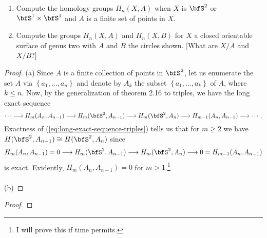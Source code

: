 \begin{problem}[Hatcher {\S}2.1, Ex.\,17]
\begin{enumerate}[label=(\alph*)]
\item Compute the homology groups $H_n(X,A)$ when $X$ is $\bfS^2$ or
  $\bfS^1\times\bfS^1$ and $A$ is a finite set of points in $X$.
\item Compute the groups $H_n(X,A)$ and $H_n(X,B)$ for $X$ a closed
  orientable surface of genus two with $A$ and $B$ the circles shown. [What
  are $X/A$ and $X/B$?]
\end{enumerate}
\end{problem}
\begin{proof}
(a) Since $A$ is a finite collection of points in $\bfS^2$, let us enumerate
the set $A$ via $\left\{ a_1,...,a_n \right\}$ and denote by $A_k$ the
subset $\left\{a_1,...,a_k\right\}$ of $A$, where $k\leq n$. Now, by the
generalization of theorem 2.16 to triples, we have the long exact sequence
\begin{equation}
\label{eq:long-exact-sequence-triples}
\cdots\longrightarrow H_m(A_n,A_{n-1})\longrightarrow
H_m(\bfS^2,A_{n-1})\longrightarrow H_m(\bfS^2,A_n)
\longrightarrow H_{m-1}(A_n,A_{n-1})\longrightarrow\cdots.
\end{equation}
Exactness of (\ref{eq:long-exact-sequence-triples}) tells us that for
$m\geq 2$ we have $H(\bfS^2,A_{n-1})\cong H(\bfS^2,A_n)$ since
\[
H_m(A_n,A_{n-1})=0\longrightarrow H_m(\bfS^2,A_{n-1})\longrightarrow
H_m(\bfS^2,A_n)\longrightarrow 0=H_{m-1}(A_n,A_{n-1})
\]
is exact. Evidently, $H_m(A_n,A_{n-1})=0$ for $m>1$.\footnote{I will prove
  this if time permits.}
\\\\
(b)
\end{proof}

\begin{problem}
\end{problem}
\begin{proof}
\end{proof}
\newpage

